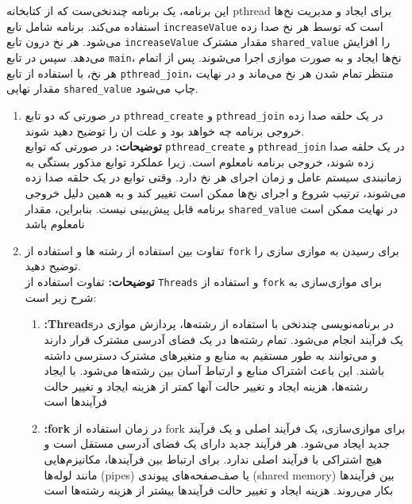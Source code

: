 \begin{qsolve}
	این برنامه، یک برنامه چندنخی‌ست که از کتابخانه pthread برای ایجاد و مدیریت نخ‌ها استفاده می‌کند. برنامه شامل تابع \texttt{increaseValue} است که توسط هر نخ صدا زده می‌شود. هر نخ درون تابع \texttt{increaseValue} مقدار مشترک \texttt{shared\_value} را افزایش می‌دهد. سپس در تابع \texttt{main}، نخ‌ها ایجاد و به صورت موازی اجرا می‌شوند. پس از اتمام هر نخ، با استفاده از تابع \texttt{pthread\_join}، منتظر تمام شدن هر نخ می‌ماند و در نهایت مقدار نهایی \texttt{shared\_value} چاپ می‌شود.
	
	
	
	\begin{enumerate}
		\item ‫در‬ ‫صورتی‬ ‫که‬ ‫دو‬ ‫تابع‬ ‫‪\texttt{pthread\_create}‬‬ ‫و‬ ‫‪\texttt{pthread\_join}‬‬ ‫در‬ ‫یک‬ ‫حلقه‬ ‫صدا‬ ‫زده‬ ‫شوند‬ ‫‪.‬‬‫خروجی‬ ‫برنامه‬ ‫چه‬ ‫خواهد ‬‫بود‬ ‫و‬ ‫علت‬ ‫ان‬ ‫را‬ ‫توضیح‬ ‫دهید‬\\ \textbf{توضیحات: }
		در صورتی که توابع \texttt{pthread\_create} و \texttt{pthread\_join} در یک حلقه صدا زده شوند، خروجی برنامه نامعلوم است. زیرا عملکرد توابع مذکور بستگی به زمانبندی سیستم عامل و زمان اجرای هر نخ دارد. وقتی توابع در یک حلقه صدا زده می‌شوند، ترتیب شروع و اجرای نخ‌ها ممکن است تغییر کند و به همین دلیل خروجی برنامه قابل پیش‌بینی نیست. بنابراین، مقدار \texttt{shared\_value} در نهایت ممکن است نامعلوم باشد
	
	
	
	\item ‫تفاوت‬ ‫بین‬ ‫استفاده‬ ‫از‬ ‫رشته‬ ‫ها‬ ‫و‬ ‫استفاده‬ ‫از‬ ‫‪\texttt{fork}‬‬ ‫برای‬ ‫رسیدن‬ ‫به‬ ‫موازی‬ ‫سازی‬ ‫را‬ ‫توضیح‬ ‫دهید‬. \\ \textbf{توضیحات: }
	تفاوت استفاده از \texttt{Threads} و استفاده از \texttt{fork} برای موازی‌سازی به شرح زیر است:
	\begin{enumerate}
		\item \textbf{:Threads}در برنامه‌نویسی چندنخی با استفاده از رشته‌ها، پردازش موازی در یک فرآیند انجام می‌شود. تمام رشته‌ها در یک فضای آدرسی مشترک قرار دارند و می‌توانند به طور مستقیم به منابع و متغیرهای مشترک دسترسی داشته باشند. این باعث اشتراک منابع و ارتباط آسان بین رشته‌ها می‌شود. با ایجاد رشته‌ها، هزینه ایجاد و تغییر حالت آنها کمتر از هزینه ایجاد و تغییر حالت فرآیندها است
	
		\item \textbf{:fork} در زمان استفاده از fork برای موازی‌سازی، یک فرآیند اصلی و یک فرآیند جدید ایجاد می‌شود. هر فرآیند جدید دارای یک فضای آدرسی مستقل است و هیچ اشتراکی با فرآیند اصلی ندارد. برای ارتباط بین فرآیندها، مکانیزم‌هایی مانند لوله‌ها (pipes) یا صف‌صفحه‌های پیوندی (shared memory) بین فرآیندها بکار می‌روند. هزینه ایجاد و تغییر حالت فرآیندها بیشتر از هزینه رشته‌ها است
	\end{enumerate}
	

\end{enumerate}
\end{qsolve}
